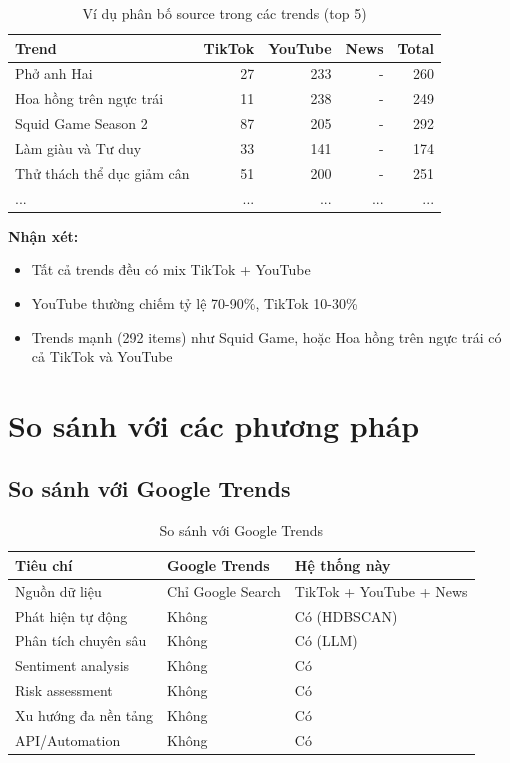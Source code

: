 \begin{table}[H]
    \centering
    \begin{tabular}{|l|r|r|r|r|}
    \hline
    \textbf{Trend} & \textbf{TikTok} & \textbf{YouTube} & \textbf{News} & \textbf{Total} \\
    \hline
    Phở anh Hai & 27 & 233 & - & 260 \\
    Hoa hồng trên ngực trái & 11 & 238 & - & 249 \\
    Squid Game Season 2 & 87 & 205 & - & 292 \\
    Làm giàu và Tư duy & 33 & 141 & - & 174 \\
    Thử thách thể dục giảm cân & 51 & 200 & - & 251 \\
    ... & ... & ... & ... & ... \\
    \hline
    \end{tabular}
    \caption{Ví dụ phân bố source trong các trends (top 5)}
    \label{table:source_by_trend}
\end{table}

\textbf{Nhận xét:}
\begin{itemize}
    \item Tất cả trends đều có mix TikTok + YouTube
    \item YouTube thường chiếm tỷ lệ 70-90\%, TikTok 10-30\%
    \item Trends mạnh (292 items) như Squid Game, hoặc Hoa hồng trên ngực trái có cả TikTok và YouTube
\end{itemize}

\section{So sánh với các phương pháp}

\subsection{So sánh với Google Trends}

\begin{table}[H]
    \centering
    \begin{tabular}{|l|l|l|}
    \hline
    \textbf{Tiêu chí} & \textbf{Google Trends} & \textbf{Hệ thống này} \\
    \hline
    Nguồn dữ liệu & Chỉ Google Search & TikTok + YouTube + News \\
    Phát hiện tự động & Không & Có (HDBSCAN) \\
    Phân tích chuyên sâu & Không & Có (LLM) \\
    Sentiment analysis & Không & Có \\
    Risk assessment & Không & Có \\
    Xu hướng đa nền tảng & Không & Có \\
    API/Automation & Không & Có \\
    \hline
    \end{tabular}
    \caption{So sánh với Google Trends}
    \label{table:comparison_google}
\end{table}

